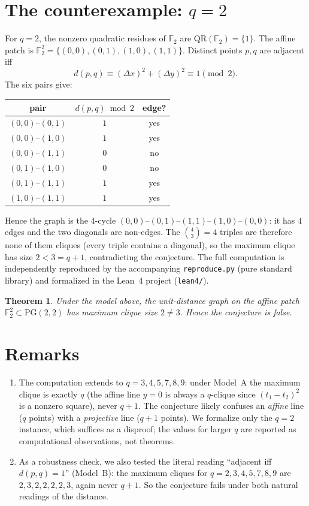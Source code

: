 \documentclass[11pt]{article}
\newtheorem{theorem}{Theorem}
\begin{document}
\section{The counterexample: $q=2$}

For $q=2$, the nonzero quadratic residues of $\mathbb{F}_2$ are
$\mathrm{QR}(\mathbb{F}_2)=\{1\}$.  The affine patch is
$\mathbb{F}_2^2=\{(0,0),(0,1),(1,0),(1,1)\}$.
Distinct points $p,q$ are adjacent iff
\[
d(p,q)\equiv (\Delta x)^2+(\Delta y)^2 \equiv 1 \pmod 2 .
\]
The six pairs give:
\begin{center}
\begin{tabular}{c|c|c}
pair & $d(p,q)\bmod 2$ & edge? \\ \hline
$(0,0)$--$(0,1)$ & $1$ & yes \\
$(0,0)$--$(1,0)$ & $1$ & yes \\
$(0,0)$--$(1,1)$ & $0$ & no \\
$(0,1)$--$(1,0)$ & $0$ & no \\
$(0,1)$--$(1,1)$ & $1$ & yes \\
$(1,0)$--$(1,1)$ & $1$ & yes
\end{tabular}
\end{center}
Hence the graph is the $4$-cycle
$(0,0)$--$(0,1)$--$(1,1)$--$(1,0)$--$(0,0)$:
it has $4$ edges and the two diagonals are non-edges.
The $\binom{4}{3}=4$ triples are therefore none of them cliques
(every triple contains a diagonal), so the maximum clique has size
$2<3=q+1$, contradicting the conjecture.  The full computation is
independently reproduced by the accompanying \texttt{reproduce.py}
(pure standard library) and formalized in the Lean~4 project
(\texttt{lean4/}).

\begin{theorem}
Under the model above, the unit-distance graph on the affine patch
$\mathbb{F}_2^2\subset\mathrm{PG}(2,2)$ has maximum clique size $2\ne 3$.
Hence the conjecture is false.
\end{theorem}

\section{Remarks}

\begin{enumerate}
\item The computation extends to $q=3,4,5,7,8,9$: under Model~A the maximum
  clique is exactly $q$ (the affine line $y=0$ is always a $q$-clique since
  $(t_1-t_2)^2$ is a nonzero square), never $q+1$.  The conjecture likely
  confuses an \emph{affine} line ($q$ points) with a \emph{projective} line
  ($q+1$ points).  We formalize only the $q=2$ instance, which suffices as a
  disproof; the values for larger $q$ are reported as computational
  observations, not theorems.
\item As a robustness check, we also tested the literal reading
  ``adjacent iff $d(p,q)=1$'' (Model~B): the maximum cliques for
  $q=2,3,4,5,7,8,9$ are $2,3,2,2,2,2,3$, again never $q+1$.  So the
  conjecture fails under both natural readings of the distance.
\end{enumerate}
\end{document}
